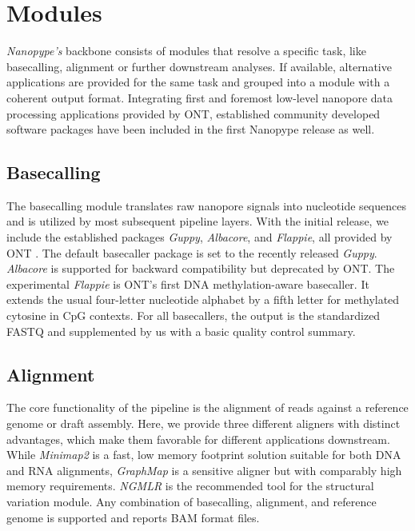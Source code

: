 \section{Modules}
\label{sec:nanopype:modules}
\textit{Nanopype’s} backbone consists of modules that resolve a specific task, like basecalling, alignment or further downstream analyses. If available, alternative applications are provided for the same task and grouped into a module with a coherent output format. Integrating first and foremost low-level nanopore data processing applications provided by ONT, established community developed software packages have been included in the first Nanopype release as well.


\subsection{Basecalling}
\label{subsec:nanopype:basecalling}
The basecalling module translates raw nanopore signals into nucleotide sequences and is utilized by most subsequent pipeline layers. With the initial release, we include the established packages \textit{Guppy}, \textit{Albacore}, and \textit{Flappie}, all provided by ONT \cite{Wick2019}. The default basecaller package is set to the recently released \textit{Guppy}. \textit{Albacore} is supported for backward compatibility but deprecated by ONT. The experimental \textit{Flappie} is ONT’s first DNA methylation-aware basecaller. It extends the usual four-letter nucleotide alphabet by a fifth letter for methylated cytosine in CpG contexts. For all basecallers, the output is the standardized FASTQ and supplemented by us with a basic quality control summary.


\subsection{Alignment}
\label{subsec:nanopype:alignment}
The core functionality of the pipeline is the alignment of reads against a reference genome or draft assembly. Here, we provide three different aligners with distinct advantages, which make them favorable for different applications downstream. While \textit{Minimap2} \cite{Li2018} is a fast, low memory footprint solution suitable for both DNA and RNA alignments, \textit{GraphMap} \cite{Sovic2016} is a sensitive aligner but with comparably high memory requirements. \textit{NGMLR} \cite{Sedlazeck2018} is the recommended tool for the structural variation module. Any combination of basecalling, alignment, and reference genome is supported and reports BAM format files.


